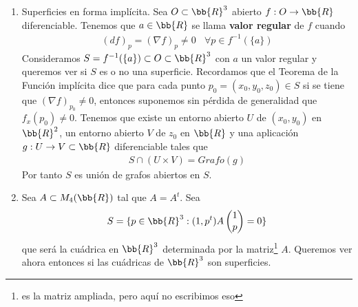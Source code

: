 \begin{ejemplo}
\begin{enumerate}
        Sea $S=S^2(c, R)$, entonces existen una traslación $T$ y una homotecia $H$ de $\bb{R}^3$ tales que 
        \begin{gather*}
            (H\circ T)(S^2) = S^2(c,R)
        \end{gather*}
        por lo que $S^2(c, R)$ es una superficie. Con este razonamiento llegamos a que las elipsoides también son superficies.

        \item Superficies en forma implícita. Sea $O\subset \bb{R}^3$ abierto $f:O\to \bb{R}$ diferenciable. Tenemos que $a\in \bb{R}$ se llama \textbf{valor regular} de $f$ cuando
        \begin{gather*}
            (df)_p = (\nabla f)_p \neq 0 \ \ \ \ \forall p\in f^{-1}(\{a\})
        \end{gather*}
        Consideramos $S=f^{-1}(\{a\})\subset O \subset \bb{R}^3$ con $a$ un valor regular y queremos ver si $S$ es o no una superficie. Recordamos que el Teorema de la Función implícita dice que para cada punto $p_0 = (x_0, y_0, z_0)\in S$ si se tiene que $(\nabla f)_{p_0}\neq 0$, entonces suponemos sin pérdida de generalidad que $f_x(p_0)\neq 0$. Tenemos que existe un entorno abierto $U$ de $(x_0,y_0)$ en $\bb{R}^2$, un entorno abierto $V$ de $z_0$ en $\bb{R}$ y una aplicación $g:U\to V\subset \bb{R}$ diferenciable tales que 
        \begin{gather*}
            S \cap (U\times V) = Grafo(g)
        \end{gather*}
        Por tanto $S$ es unión de grafos abiertos en $S$.

        \item Sea $A\subset M_4(\bb{R})$ tal que $A=A^t$. Sea
        \begin{gather*}
            S = \{p\in \bb{R}^3 : (1,p^t)A \begin{pmatrix} 1\\p\end{pmatrix} = 0\} 
        \end{gather*}
        que será la cuádrica en $\bb{R}^3$ determinada por la matriz\footnote{es la matriz ampliada, pero aquí no escribimos eso} $A$. Queremos ver ahora entonces si las cuádricas de $\bb{R}^3$ son superficies.\\


\end{enumerate}
\end{ejemplo}
